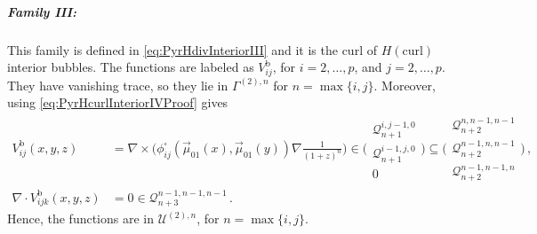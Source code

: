 \subparagraph{Family III:}
This family is defined in \eqref{eq:PyrHdivInteriorIII} and it is the curl of $H(\mathrm{curl})$ interior bubbles.
The functions are labeled as $V_{ij}^{\mathrm{b}}$, for $i=2,\ldots,p$, and $j=2,\ldots,p$.
They have vanishing trace, so they lie in $\Gamma^{(2),n}$ for $n=\max\{i,j\}$.
Moreover, using \eqref{eq:PyrHcurlInteriorIVProof} gives
\begin{equation}
\begin{aligned}
	V_{ij}^\mathrm{b}(x,y,z)&=
		\nabla\!\times\!\Big(\phi_{ij}^\square(\vec{\mu}_{01}(x),\vec{\mu}_{01}(y))\nabla\textstyle{\frac{1}{(1+z)^n}}\Big)
			\in\Bigg(\begin{smallmatrix}\mathcal{Q}_{n+1}^{i,j-1,0}\\[2pt]\mathcal{Q}_{n+1}^{i-1,j,0}\\[2pt]0\end{smallmatrix}\Bigg)
				\subseteq\Bigg(\begin{smallmatrix}\mathcal{Q}_{n+2}^{n,n-1,n-1}\\[2pt]\mathcal{Q}_{n+2}^{n-1,n,n-1}\\[2pt]
					\mathcal{Q}_{n+2}^{n-1,n-1,n}\end{smallmatrix}\Bigg)\,,\\
	\nabla\!\cdot\! V_{ijk}^\mathrm{b}(x,y,z)&=0\in\mathcal{Q}_{n+3}^{n-1,n-1,n-1}\,.
\end{aligned}
\end{equation}
Hence, the functions are in $\mathcal{U}^{(2),n}$, for $n=\max\{i,j\}$.


